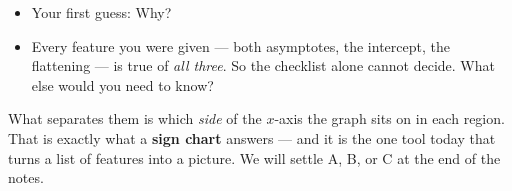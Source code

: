 \documentclass[10pt]{article}
\begin{document}
\begin{hookbox}
\begin{center}
\end{center}
\vspace{-2pt}
\begin{itemize}\setlength{\itemsep}{2pt}
  \item Your first guess:  \quad Why? 
  \item Every feature you were given --- both asymptotes, the intercept, the flattening --- is true of
        \emph{all three}. So the checklist alone cannot decide. What else would you need to know?
\end{itemize}
\vspace{-2pt}
What separates them is which \emph{side} of the $x$-axis the graph sits on in each region. That is
exactly what a \textbf{sign chart} answers --- and it is the one tool today that turns a list of
features into a picture. We will settle A, B, or C at the end of the notes.
\end{hookbox}
\end{document}
